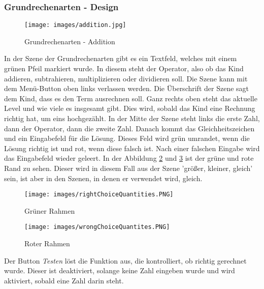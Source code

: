 \subsubsection{Grundrechenarten - Design}
\begin{figure}[htbp]
  \centering
  \texttt{[image: images/addition.jpg]}
  \caption{Grundrechenarten - Addition}
  \label{basicOperation}
\end{figure}
In der Szene der Grundrechenarten gibt es ein Textfeld, welches mit einem grünen Pfeil markiert wurde. In diesem steht der Operator, also ob das Kind addieren, subtrahieren, multiplizieren oder dividieren soll. Die Szene kann mit dem Menü-Button oben links verlassen werden. Die Überschrift der Szene sagt dem Kind, dass es den Term ausrechnen soll. Ganz rechts oben steht das aktuelle Level und wie viele es insgesamt gibt. Dies wird, sobald das Kind eine Rechnung richtig hat, um eins hochgezählt. In der Mitte der Szene steht links die erste Zahl, dann der Operator, dann die zweite Zahl. Danach kommt das Gleichheitszeichen und ein Eingabefeld für die Lösung. Dieses Feld wird grün umrandet, wenn die Lösung richtig ist und rot, wenn diese falsch ist. Nach einer falschen Eingabe wird das Eingabefeld wieder geleert. In der Abbildung \ref{greenBorder} und \ref{redBorder} ist der grüne und rote Rand zu sehen. Dieser wird in diesem Fall aus der Szene 'größer, kleiner, gleich' sein, ist aber in den Szenen, in denen er verwendet wird, gleich. 
\begin{figure}[htbp]
  \centering
  \texttt{[image: images/rightChoiceQuantities.PNG]}
  \caption{Grüner Rahmen}
  \label{greenBorder}
\end{figure}
\begin{figure}[htbp]
  \centering
  \texttt{[image: images/wrongChoiceQuantites.PNG]}
  \caption{Roter Rahmen}
  \label{redBorder}
\end{figure}
Der Button \textit{Testen} löst die Funktion aus, die kontrolliert, ob richtig gerechnet wurde. Dieser ist deaktiviert, solange keine Zahl eingeben wurde und wird aktiviert, sobald eine Zahl darin steht.
